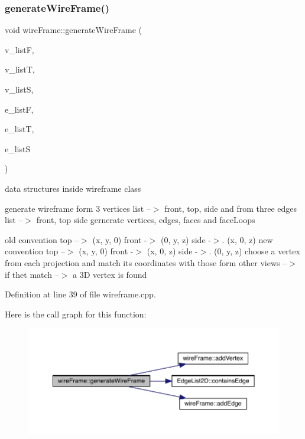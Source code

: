 \subsubsection{\texorpdfstring{generate\+Wire\+Frame()}{generateWireFrame()}}
{\footnotesize\ttfamily void wire\+Frame\+::generate\+Wire\+Frame (\begin{DoxyParamCaption}\item[{\mbox{\hyperlink{class_vertex_list2_d}{Vertex\+List2D}}}]{v\+\_\+listF,  }\item[{\mbox{\hyperlink{class_vertex_list2_d}{Vertex\+List2D}}}]{v\+\_\+listT,  }\item[{\mbox{\hyperlink{class_vertex_list2_d}{Vertex\+List2D}}}]{v\+\_\+listS,  }\item[{\mbox{\hyperlink{class_edge_list2_d}{Edge\+List2D}}}]{e\+\_\+listF,  }\item[{\mbox{\hyperlink{class_edge_list2_d}{Edge\+List2D}}}]{e\+\_\+listT,  }\item[{\mbox{\hyperlink{class_edge_list2_d}{Edge\+List2D}}}]{e\+\_\+listS }\end{DoxyParamCaption})}



data structures inside wireframe class 

generate wireframe form 3 vertices list --$>$ front, top, side and from three edges list --$>$ front, top side gernerate vertices, edges, faces and face\+Loops

old convention top --$>$ (x, y, 0) front -\/$>$ (0, y, z) side -\/$>$. (x, 0, z) new convention top --$>$ (x, y, 0) front -\/$>$ (x, 0, z) side -\/$>$. (0, y, z) choose a vertex from each projection and match its coordinates with those form other views --$>$ if thet match --$>$ a 3D vertex is found

Definition at line 39 of file wireframe.\+cpp.

Here is the call graph for this function\+:
\nopagebreak
\begin{figure}[H]
\begin{center}
\leavevmode
\includegraphics[width=350pt]{classwire_frame_ad31eeecbba164e703cd67ea11c13df51_cgraph}
\end{center}
\end{figure}
\mbox{\label{classwire_frame_adafc56f2ed107ea6d8449da17cc9f39b}} 
